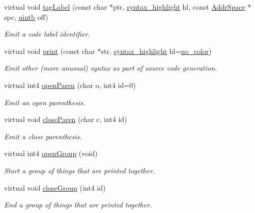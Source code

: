 \begin{DoxyCompactItemize}
virtual void \mbox{\hyperlink{class_emit_pretty_print_a6da4bd229730cce20996e9611d5deffd}{tag\+Label}} (const char $\ast$ptr, \mbox{\hyperlink{class_emit_xml_a7c3577436da429c3c75f4b82cac6864f}{syntax\+\_\+highlight}} hl, const \mbox{\hyperlink{class_addr_space}{Addr\+Space}} $\ast$spc, \mbox{\hyperlink{types_8h_a2db313c5d32a12b01d26ac9b3bca178f}{uintb}} off)
\begin{DoxyCompactList}\small\item\em Emit a code label identifier. \end{DoxyCompactList}\item 
virtual void \mbox{\hyperlink{class_emit_pretty_print_ac0134af230be5c379fd8173a7e99fac7}{print}} (const char $\ast$str, \mbox{\hyperlink{class_emit_xml_a7c3577436da429c3c75f4b82cac6864f}{syntax\+\_\+highlight}} hl=\mbox{\hyperlink{class_emit_xml_a7c3577436da429c3c75f4b82cac6864facf637f33b975ebd31bda638a66d5b052}{no\+\_\+color}})
\begin{DoxyCompactList}\small\item\em Emit other (more unusual) syntax as part of source code generation. \end{DoxyCompactList}\item 
virtual int4 \mbox{\hyperlink{class_emit_pretty_print_a45992e62b83097eccbd431e1957f2108}{open\+Paren}} (char o, int4 id=0)
\begin{DoxyCompactList}\small\item\em Emit an open parenthesis. \end{DoxyCompactList}\item 
virtual void \mbox{\hyperlink{class_emit_pretty_print_a83c6f5a16300b7b45526faf1f3c5c7de}{close\+Paren}} (char c, int4 id)
\begin{DoxyCompactList}\small\item\em Emit a close parenthesis. \end{DoxyCompactList}\item 
virtual int4 \mbox{\hyperlink{class_emit_pretty_print_aebc625908acafdfead7424ea48d53ce1}{open\+Group}} (void)
\begin{DoxyCompactList}\small\item\em Start a group of things that are printed together. \end{DoxyCompactList}\item 
virtual void \mbox{\hyperlink{class_emit_pretty_print_a3a7553ee225ff54a164108ce0ab55102}{close\+Group}} (int4 id)
\begin{DoxyCompactList}\small\item\em End a group of things that are printed together. \end{DoxyCompactList}\item 

\end{DoxyCompactItemize}
